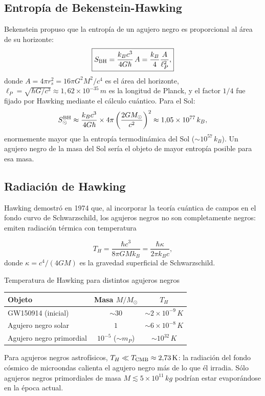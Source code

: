 \subsection{Entropía de Bekenstein-Hawking}

Bekenstein \cite{Bekenstein1973} propuso que la entropía de un agujero negro es proporcional al área de su horizonte:
\begin{equation}
  \boxed{S_{\rm BH} = \frac{k_B c^3}{4G\hbar}\,A = \frac{k_B}{4}\frac{A}{\ell_P^2},}
  \label{eq:entropia_BH}
\end{equation}
donde $A = 4\pi r_s^2 = 16\pi G^2 M^2/c^4$ es el área del horizonte, $\ell_P = \sqrt{\hbar G/c^3} \approx 1{,}62\times10^{-35}\,\si{m}$ es la longitud de Planck, y el factor $1/4$ fue fijado por Hawking mediante el cálculo cuántico. Para el Sol:
\begin{equation}
  S_\odot^{\rm BH} \approx \frac{k_B c^3}{4G\hbar}\times 4\pi\left(\frac{2GM_\odot}{c^2}\right)^2
  \approx 1{,}05\times10^{77}\,k_B,
\end{equation}
enormemente mayor que la entropía termodinámica del Sol ($\sim 10^{57}\,k_B$). Un agujero negro de la masa del Sol sería el objeto de mayor entropía posible para esa masa.

\subsection{Radiación de Hawking}

Hawking demostró en 1974 \cite{Hawking1975} que, al incorporar la teoría cuántica de campos en el fondo curvo de Schwarzschild, los agujeros negros no son completamente negros: emiten radiación térmica con temperatura

\begin{equation}
  \boxed{T_H = \frac{\hbar c^3}{8\pi G M k_B} = \frac{\hbar\kappa}{2\pi k_B c},}
  \label{eq:temp_hawking}
\end{equation}
donde $\kappa = c^4/(4GM)$ es la gravedad superficial de Schwarzschild.

\begin{ejemplo}{Temperatura de Hawking para distintos agujeros negros}{}
\begin{center}
\begin{tabular}{lcc}
\hline
Objeto & Masa $M/M_\odot$ & $T_H$ \\
\hline
GW150914 (inicial) & $\sim 30$ & $\sim 2\times10^{-9}\,\si{K}$ \\
Agujero negro solar & $1$ & $\sim 6\times10^{-8}\,\si{K}$ \\
Agujero negro primordial & $10^{-5}$ ($\sim m_P$) & $\sim 10^{32}\,\si{K}$ \\
\hline
\end{tabular}
\end{center}
Para agujeros negros astrofísicos, $T_H \ll T_{\rm CMB} \approx 2{,}73\,\si{K}$: la radiación del fondo cósmico de microondas calienta el agujero negro más de lo que él irradia. Sólo agujeros negros primordiales de masa $M \lesssim 5\times10^{11}\,\si{kg}$ podrían estar evaporándose en la época actual.
\end{ejemplo}

